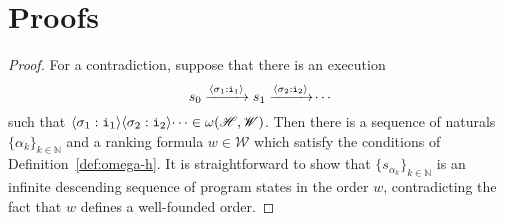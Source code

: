 \documentclass[9pt,nocopyrightspace]{sigplanconf}
\theoremstyle{definition}
\newcommand{\tuple}[1]{\langle #1 \rangle}
\newcommand{\rankformulas}{\mathscr{W}}
\newcommand{\idx}[1]{\text{\rm\texttt{#1}}}
\newcommand{\ic}[2]{{\tuple{#1 : #2}}}
\begin{document}



\appendix

\section{Proofs}

\thmsoundness*
\begin{proof}
  For a contradiction, suppose that there is an execution
  \[ s_0 \xrightarrow{\ic{\sigma_1}{\idx{i}_1}} s_1 \xrightarrow{\ic{\sigma_2}{\idx{i}_2}} \dotsi \]
  such that $\ic{\sigma_1}{\idx{i}_1}\ic{\sigma_2}{\idx{i}_2}\dotsi \in
  \omega(\mathscr{H},\rankformulas)$.  Then there is a sequence of naturals
  $\{\alpha_k\}_{k \in \mathbb{N}}$ and a ranking formula $w \in
  \rankformulas$ which satisfy the conditions of Definition~\ref{def:omega-h}.
  It is straightforward to show that $\{s_{\alpha_k}\}_{k \in \mathbb{N}}$ is an
  infinite descending sequence of program states in the order $w$,
  contradicting the fact that $w$ defines a well-founded order.
\end{proof}
\end{document}
